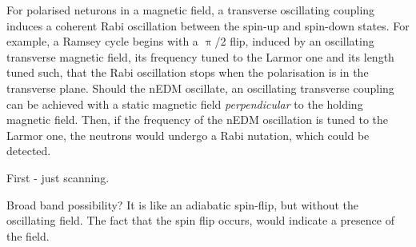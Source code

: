 For polarised neturons in a magnetic field, a transverse oscillating coupling induces a coherent Rabi oscillation between the spin-up and spin-down states.
For example, a Ramsey cycle begins with a $\uppi$/2 flip, induced by an oscillating transverse magnetic field, its frequency tuned to the Larmor one and its length tuned such, that the Rabi oscillation stops when the polarisation is in the transverse plane. Should the nEDM oscillate, an oscillating transverse coupling can be achieved with a static magnetic field \emph{perpendicular} to the holding magnetic field. Then, if the frequency of the nEDM oscillation is tuned to the Larmor one, the neutrons would undergo a Rabi nutation, which could be detected.



First - just scanning.

Broad band possibility? It is like an adiabatic spin-flip, but without the oscillating field. The fact that the spin flip occurs, would indicate a presence of the field.

